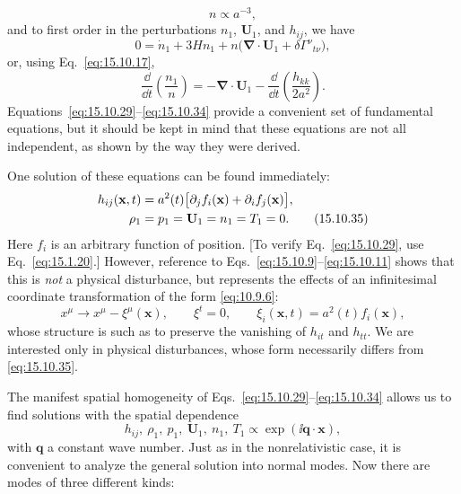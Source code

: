 \[
  n\propto a^{-3},
\]
and to first order in the perturbations \(n_1\), \(\mathbf U_1\), and
\(h_{ij}\), we have
\[
  0
  =
  \dot n_1+3Hn_1
  +n\bigl(\boldsymbol{\nabla}\cdot\mathbf U_1
  +\delta\Gamma^\nu{}_{t\nu}\bigr),
\]
or, using Eq.~\eqref{eq:15.10.17},
\begin{equation}
  \frac{\dd}{\dd t}\left(\frac{n_1}{n}\right)
  =
  -\boldsymbol{\nabla}\cdot\mathbf U_1
  -\frac{\dd}{\dd t}\left(\frac{h_{kk}}{2a^2}\right).
  \tag{15.10.34}\label{eq:15.10.34}
\end{equation}
Equations~\eqref{eq:15.10.29}--\eqref{eq:15.10.34} provide a convenient
set of fundamental equations, but it should be kept in mind that these
equations are not all independent, as shown by the way they were derived.

One solution of these equations can be found immediately:
\begin{align}
  h_{ij}(\mathbf x,t)
  &=
  a^2(t)
  \bigl[\partial_jf_i(\mathbf x)+\partial_if_j(\mathbf x)\bigr],
  \notag\\
  \rho_1&=p_1=\mathbf U_1=n_1=T_1=0.
  \tag{15.10.35}\label{eq:15.10.35}
\end{align}
Here \(f_i\) is an arbitrary function of position. [To verify
Eq.~\eqref{eq:15.10.29}, use Eq.~\eqref{eq:15.1.20}.] However, reference
to Eqs.~\eqref{eq:15.10.9}--\eqref{eq:15.10.11} shows that this is
\emph{not} a physical disturbance, but represents the effects of an
infinitesimal coordinate transformation of the form \eqref{eq:10.9.6}:
\begin{equation}
  x^\mu\longrightarrow x^\mu-\xi^\mu(\mathbf x),
  \qquad
  \xi^t=0,
  \qquad
  \xi_i(\mathbf x,t)=a^2(t)f_i(\mathbf x),
  \tag{15.10.36}\label{eq:15.10.36}
\end{equation}
whose structure is such as to preserve the vanishing of \(h_{it}\) and
\(h_{tt}\). We are interested only in physical disturbances, whose form
necessarily differs from \eqref{eq:15.10.35}.

The manifest spatial homogeneity of
Eqs.~\eqref{eq:15.10.29}--\eqref{eq:15.10.34} allows us to find solutions
with the spatial dependence
\begin{equation}
  h_{ij},\ \rho_1,\ p_1,\ \mathbf U_1,\ n_1,\ T_1
  \propto
  \exp(\ii\mathbf q\cdot\mathbf x),
  \tag{15.10.37}\label{eq:15.10.37}
\end{equation}
with \(\mathbf q\) a constant wave number. Just as in the nonrelativistic
case, it is convenient to analyze the general solution into normal modes.
Now there are modes of three different kinds:

